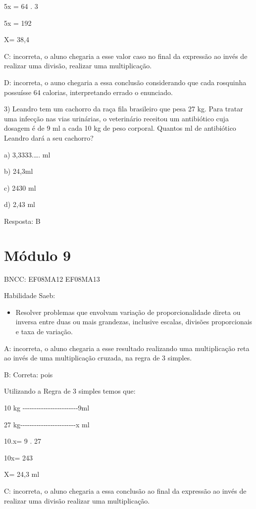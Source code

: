 5x = 64 . 3

5x = 192

X= 38,4

C: incorreta, o aluno chegaria a esse valor caso no final da expressão
ao invés de realizar uma divisão, realizar uma multiplicação.

D: incorreta, o auno chegaria a essa conclusão considerando que cada
rosquinha possuísse 64 calorias, interpretando errado o enunciado.

3) Leandro tem um cachorro da raça fila brasileiro que pesa 27 kg. Para
tratar uma infecção nas vias urinárias, o veterinário receitou um
antibiótico cuja dosagem é de 9 ml a cada 10 kg de peso corporal.
Quantos ml de antibiótico Leandro dará a seu cachorro?

a) 3,3333.\ldots. ml

b) 24,3ml

c) 2430 ml

d) 2,43 ml

Resposta: B

\section{Módulo 9}

BNCC: EF08MA12 EF08MA13

Habilidade Saeb:

\begin{itemize}
\tightlist
\item
  Resolver problemas que envolvam variação de proporcionalidade direta
  ou inversa entre duas ou mais grandezas, inclusive escalas, divisões
  proporcionais e taxa de variação.
\end{itemize}

A: incorreta, o aluno chegaria a esse resultado realizando uma
multiplicação reta ao invés de uma multiplicação cruzada, na regra de 3
simples.

B: Correta: pois

Utilizando a Regra de 3 simples temos que:

10 kg
-\/-\/-\/-\/-\/-\/-\/-\/-\/-\/-\/-\/-\/-\/-\/-\/-\/-\/-\/-\/-\/-\/-\/-9ml

27
kg-\/-\/-\/-\/-\/-\/-\/-\/-\/-\/-\/-\/-\/-\/-\/-\/-\/-\/-\/-\/-\/-\/-\/-x
ml

10.x= 9 . 27

10x= 243

X= 24,3 ml

C: incorreta, o aluno chegaria a essa conclusão ao final da expressão ao
invés de realizar uma divisão realizar uma multiplicação.

